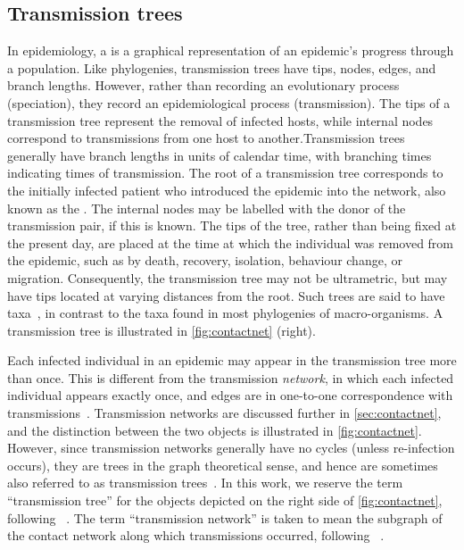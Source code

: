 \subsection{Transmission trees}

In epidemiology, a  is a graphical representation of an
epidemic's progress through a population. Like phylogenies, transmission trees
have tips, nodes, edges, and branch lengths. However, rather than recording an
evolutionary process (speciation), they record an epidemiological process
(transmission). The tips of a transmission tree represent the removal of
infected hosts, while internal nodes correspond to transmissions from one host
to another.Transmission trees generally have branch lengths in units of
calendar time, with branching times indicating times of transmission. The root
of a transmission tree corresponds to the initially infected patient who
introduced the epidemic into the network, also known as the .
The internal nodes may be labelled with the donor of the transmission pair, if
this is known. The tips of the tree, rather than being fixed at the present
day, are placed at the time at which the individual was removed from the
epidemic, such as by death, recovery, isolation, behaviour change, or
migration. Consequently, the transmission tree may not be ultrametric, but may
have tips located at varying distances from the root. Such trees are said to
have  taxa~\autocite{drummond2003measurably}, in contrast
to the  taxa found in most phylogenies of macro-organisms. A
transmission tree is illustrated in \cref{fig:contactnet} (right). 

Each infected individual in an epidemic may appear in the transmission tree
more than once. This is different from the transmission \emph{network}, in
which each infected individual appears exactly once, and edges are in
one-to-one correspondence with transmissions~\autocite{welch2011statistical,
keeling2005networks}. Transmission networks are discussed further in
\cref{sec:contactnet}, and the distinction between the two objects is
illustrated in \cref{fig:contactnet}. However, since transmission networks
generally have no cycles (unless re-infection occurs), they are trees in the
graph theoretical sense, and hence are sometimes also referred to as
transmission trees~\autocite[\eg][]{kenah2015algorithms}. In this work, we
reserve the term ``transmission tree'' for the objects depicted on the right
side of \cref{fig:contactnet}, following \eg~\autocite{stadler2013uncovering}.
The term ``transmission network'' is taken to mean the subgraph of the contact
network along which transmissions occurred, following
\eg~\autocite{welch2011statistical, keeling2005networks}.

